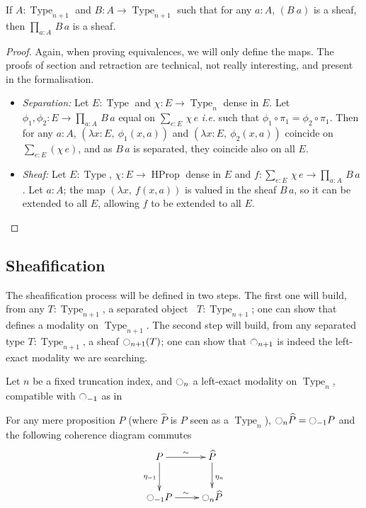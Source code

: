\documentclass[notfinal]{jfrarticle}
\DeclareMathOperator{\Type}{Type}
\DeclareMathOperator{\HProp}{HProp}
\newcommand{\modal}{\ensuremath{\ocircle}}
\newcommand \separated {\mathop{\square_{n+1}} }
\newcommand{\sumD}[3]{\sum_{#1:#2}\, #3}
\newcommand{\prodD}[3]{\prod_{#1:#2}\, #3}
\newcommand{\code}[1]{\texttt{#1}}
\newcommand{\ie}{\emph{i.e.}}
\begin{document}
\begin{prop}[\thethm\ (\code{dep\_prod\_SnType\_j\_Type})]
\label{prop:sheaf-forall}
  If $A:\Type_{n+1}$ and $B:A \to \Type_{n+1}$ such that for any
  $a:A$, $(B~a)$ is a sheaf, then $\prodD a A {B\, a}$ is a sheaf.
\end{prop}
\begin{proof}
  Again, when proving equivalences, we will only define the maps. The
  proofs of section and retraction are technical, not really
  interesting, and present in the formalisation.
  \begin{itemize}
  \item {\em Separation:} Let $E:\Type$ and $\chi:E \to \Type_n$ dense
    in $E$. Let $\phi_1,\phi_2:E\to \prodD a A {B\, a}$ equal on
    $\sumD e E{\chi\, e}$ \ie{} such that $\phi_1\circ \pi_1 = \phi_2\circ
    \pi_1$.
    Then for any $a:A$, $(\lambda x:E,~\phi_1(x, a))$
    and $(\lambda x:E,~\phi_2(x,a))$
    coincide on $\sum_{e:E}(\chi\, e)$, and as $B\, a$ is separated,
    they coincide also on all $E$.
  \item {\em Sheaf:} Let $E:\Type$, $\chi:E\to \HProp$ dense in $E$ and
    $f:\sumD e E {\chi\, e}\to \prodD a A{B\,a}$. Let $a:A$; the
    map $(\lambda x,~f(x,a))$ is valued in the sheaf $B\, a$, so it
    can be extended to all $E$, allowing $f$ to be extended to all
    $E$.
  \end{itemize}
\end{proof}

\subsection{Sheafification}
\label{ssec:sheafification}

The sheafification process will be defined in two steps. The first
one will build, from any $T:\Type_{n+1}$, a separated object $\separated
T:\Type_{n+1}$; one can show that $\separated$ defines a modality on
$\Type_{n+1}$. The second step will build, from any separated type
$T:\Type_{n+1}$, a sheaf $\modal_{n+1}(T)$; one can show that
$\modal_{n+1}$ is indeed the left-exact modality we are searching.

Let $n$ be a fixed truncation index, and $\modal_n$ a left-exact
modality on $\Type_n$, compatible with $\modal_{-1}$ as in
\begin{cond}\label{cond:hprop}
  For any mere proposition $P$ (where $\widehat P$ is $P$ seen as a
  $\Type_n$),  $\modal_n \widehat P = \modal_{-1} P$ and the
  following coherence diagram commutes
  \[\xymatrix{
    P \ar@{->}^{\sim}[r] \ar[d]_{\eta_{-1}} & \widehat P \ar[d]^{\eta_n} \\
    \modal_{-1} P \ar@{->}^{\sim}[r] & \modal_n \widehat P 
  }\]
\end{cond}
\end{document}
